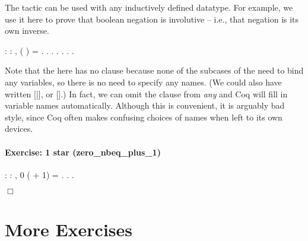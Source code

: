 \documentclass[12pt]{report}
\begin{document}
    The  tactic can be used with any inductively defined
    datatype.  For example, we use it here to prove that boolean
    negation is involutive -- i.e., that negation is its own
    inverse. \begin{coqdoccode}
\coqdocemptyline
\coqdocnoindent
{}  : \coqdockw{\ensuremath{\forall}}  : ,\coqdoceol
\coqdocindent{1.00em}
 ( ) = .\coqdoceol
\coqdocnoindent
{}.\coqdoceol
\coqdocindent{1.00em}
 .  .\coqdoceol
\coqdocindent{2.00em}
.\coqdoceol
\coqdocindent{2.00em}
. .\coqdoceol
\coqdocemptyline
\end{coqdoccode}
Note that the  here has no  clause because
    none of the subcases of the  need to bind any variables,
    so there is no need to specify any names.  (We could also have
    written  [|], or  [].)  In fact, we can omit the 
    clause from \textit{any}  and Coq will fill in variable names
    automatically.  Although this is convenient, it is arguably bad
    style, since Coq often makes confusing choices of names when left
    to its own devices. 

\paragraph{Exercise: 1 star (zero\_nbeq\_plus\_1)}

\begin{coqdoccode}
\coqdocnoindent
{}  : \coqdockw{\ensuremath{\forall}}  : ,\coqdoceol
\coqdocindent{1.00em}
 0 ( + 1) = .\coqdoceol
\coqdocnoindent
{}.\coqdoceol
 .\coqdoceol
\coqdocemptyline
\end{coqdoccode}
\ensuremath{\Box} \begin{coqdoccode}
\coqdocemptyline
\end{coqdoccode}
\section{More Exercises}
\end{document}
